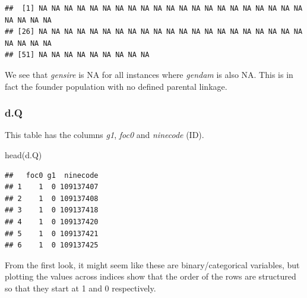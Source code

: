 \documentclass[
]{article}
\newenvironment{Shaded}{\begin{snugshade}}{\end{snugshade}}
\newcommand{\AttributeTok}[1]{\textcolor[rgb]{0.77,0.63,0.00}{#1}}
\newcommand{\DecValTok}[1]{\textcolor[rgb]{0.00,0.00,0.81}{#1}}
\newcommand{\FunctionTok}[1]{\textcolor[rgb]{0.00,0.00,0.00}{#1}}
\newcommand{\NormalTok}[1]{#1}
\newcommand{\SpecialCharTok}[1]{\textcolor[rgb]{0.00,0.00,0.00}{#1}}
\newcommand{\StringTok}[1]{\textcolor[rgb]{0.31,0.60,0.02}{#1}}
\begin{document}
\begin{verbatim}
##  [1] NA NA NA NA NA NA NA NA NA NA NA NA NA NA NA NA NA NA NA NA NA NA NA NA NA
## [26] NA NA NA NA NA NA NA NA NA NA NA NA NA NA NA NA NA NA NA NA NA NA NA NA NA
## [51] NA NA NA NA NA NA NA NA NA
\end{verbatim}

We see that \emph{gensire} is NA for all instances where \emph{gendam}
is also NA. This is in fact the founder population with no defined
parental linkage.

\hypertarget{d.q}{%
\subsubsection*{d.Q}\label{d.q}}

This table has the columns \emph{g1}, \emph{foc0} and \emph{ninecode}
(ID).

\begin{Shaded}
\begin{Highlighting}[]
\FunctionTok{head}\NormalTok{(d.Q)}
\end{Highlighting}
\end{Shaded}

\begin{verbatim}
##   foc0 g1  ninecode
## 1    1  0 109137407
## 2    1  0 109137408
## 3    1  0 109137418
## 4    1  0 109137420
## 5    1  0 109137421
## 6    1  0 109137425
\end{verbatim}

From the first look, it might seem like these are binary/categorical
variables, but plotting the values across indices show that the order of
the rows are structured so that they start at 1 and 0 respectively.

\begin{Shaded}
\end{Shaded}
\end{document}
